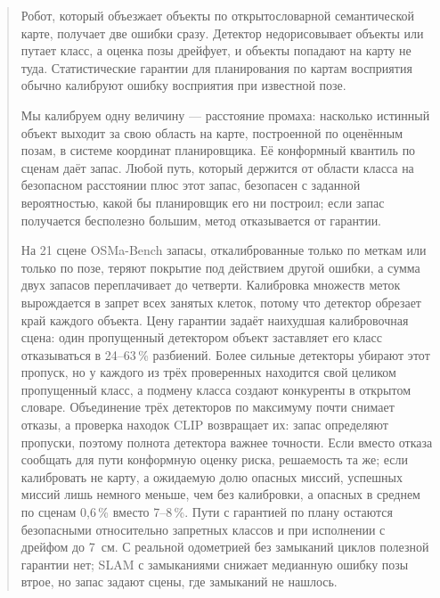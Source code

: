 \begin{abstract}
\noindent Робот, который объезжает объекты по открытословарной семантической карте, получает две ошибки сразу. Детектор недорисовывает объекты или путает класс, а оценка позы дрейфует, и объекты попадают на карту не туда. Статистические гарантии для планирования по картам восприятия обычно калибруют ошибку восприятия при известной позе.

Мы калибруем одну величину --- расстояние промаха: насколько истинный объект выходит за свою область на карте, построенной по оценённым позам, в системе координат планировщика. Её конформный квантиль по сценам даёт запас. Любой путь, который держится от области класса на безопасном расстоянии плюс этот запас, безопасен с заданной вероятностью, какой бы планировщик его ни построил; если запас получается бесполезно большим, метод отказывается от гарантии.

На 21 сцене OSMa-Bench запасы, откалиброванные только по меткам или только по позе, теряют покрытие под действием другой ошибки, а сумма двух запасов переплачивает до четверти. Калибровка множеств меток вырождается в запрет всех занятых клеток, потому что детектор обрезает край каждого объекта. Цену гарантии задаёт наихудшая калибровочная сцена: один пропущенный детектором объект заставляет его класс отказываться в 24--63\,\% разбиений. Более сильные детекторы убирают этот пропуск, но у каждого из трёх проверенных находится свой целиком пропущенный класс, а подмену класса создают конкуренты в открытом словаре. Объединение трёх детекторов по максимуму почти снимает отказы, а проверка находок CLIP возвращает их: запас определяют пропуски, поэтому полнота детектора важнее точности. Если вместо отказа сообщать для пути конформную оценку риска, решаемость та же; если калибровать не карту, а ожидаемую долю опасных миссий, успешных миссий лишь немного меньше, чем без калибровки, а опасных в среднем по сценам 0,6\,\% вместо 7--8\,\%. Пути с гарантией по плану остаются безопасными относительно запретных классов и при исполнении с дрейфом до 7~см. С реальной одометрией без замыканий циклов полезной гарантии нет; SLAM с замыканиями снижает медианную ошибку позы втрое, но запас задают сцены, где замыканий не нашлось.
\end{abstract}
